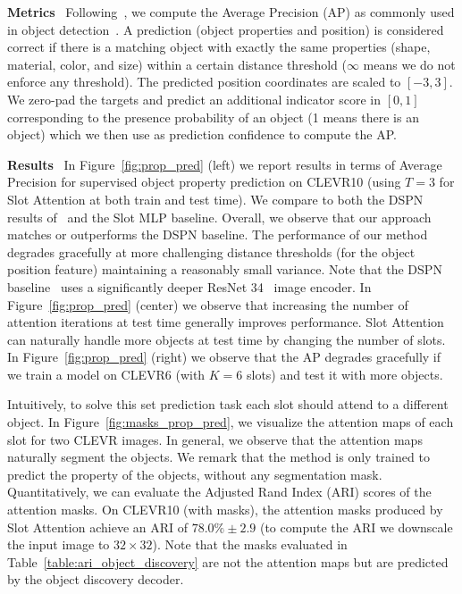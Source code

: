 \documentclass{article}
\begin{document}
\textbf{Metrics} \
Following~\citet{zhang2019deep}, we compute the Average Precision (AP) as commonly used in object detection~\citep{everingham2015pascal}. A prediction (object properties and position) is considered correct if there is a matching object with exactly the same properties (shape, material, color, and size) within a certain distance threshold ($\infty$ means we do not enforce any threshold).
The predicted position coordinates are scaled to $[-3, 3]$. We zero-pad the targets and predict an additional indicator score in $[0, 1]$ corresponding to the presence probability of an object (1 means there is an object) which we then use as prediction confidence to compute the AP.

\textbf{Results} \
In Figure~\ref{fig:prop_pred} (left) we report results in terms of Average Precision for supervised object property prediction on CLEVR10 (using $T=3$ for Slot Attention at both train and test time). We compare to both the DSPN results of~\citep{zhang2019deep} and the Slot MLP baseline. Overall, we observe that our approach matches or outperforms the DSPN baseline. The performance of our method degrades gracefully at more challenging distance thresholds (for the object position feature) maintaining a reasonably small variance. Note that the DSPN baseline~\citep{zhang2019deep} uses a significantly deeper ResNet 34~\citep{he2016deep} image encoder. In Figure~\ref{fig:prop_pred} (center) we observe that increasing the number of attention iterations at test time generally improves performance. Slot Attention  can naturally handle more objects at test time by changing the number of slots. In Figure~\ref{fig:prop_pred} (right) we observe that the AP degrades gracefully if we train a model on CLEVR6 (with $K=6$ slots) and test it with more objects.

Intuitively, to solve this set prediction task each slot should attend to a different object. In Figure~\ref{fig:masks_prop_pred}, we visualize the attention maps of each slot for two CLEVR images. In general, we observe that the attention maps naturally segment the objects. We remark that the method is only trained to predict the property of the objects, without any segmentation mask. Quantitatively, we can evaluate the Adjusted Rand Index (ARI) scores of the attention masks. On CLEVR10 (with masks), the attention masks produced by Slot Attention achieve an ARI of $78.0\% \pm 2.9$ (to compute the ARI we downscale the input image to $32 \times 32$). Note that the masks evaluated in Table~\ref{table:ari_object_discovery} are not the attention maps but are predicted by the object discovery decoder.
\end{document}
